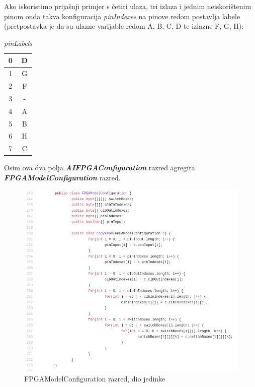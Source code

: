 \documentclass[times, utf8, zavrsni]{fer}
\begin{document}
Ako iskoristimo prijašnji primjer s četiri ulaza, tri izlaza i jednim neiskorištenim pinom onda takva konfiguracija \emph{pinIndexes} na pinove redom postavlja labele (pretpostavka je da su ulazne varijable redom A, B, C, D te izlazne F, G, H):

 \begin{table}[htb]
 	\caption{\emph{pinLabels}}
 	\label{pinLabels}
 	\centering
 	\begin{tabular}{|c | c |} \hline
 		0 & D \\ \hline
 		1 & G \\ \hline
 		2 & F \\ \hline
 		3 & - \\ \hline
 		4 & A \\ \hline
 		5 & B \\ \hline
 		6 & H \\ \hline
 		7 & C \\ \hline
 	\end{tabular}
 \end{table}

Osim ova dva polja \textbf{\emph{AIFPGAConfiguration}} razred agregira \textbf{\emph{FPGAModelConfiguration}} razred. 

\begin{figure}[!htb]
	\centering
	\includegraphics[width=18cm]{slike/FPGAModelConf.png}
	\caption{FPGAModelConfiguration razred, dio jedinke}
	\label{fig:fpga-model-conf}
\end{figure} 
\end{document}
